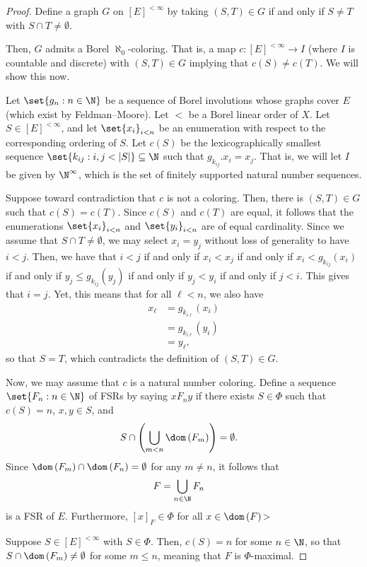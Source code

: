 \documentclass[10pt]{mypackage}
\begin{document}
\begin{proof}
  Define a graph $G$ on $\left[ E \right]^{ <\infty }$ by taking $\left( S,T \right)\in G$ if and only if $S\neq T$ with $S\cap T\neq \emptyset$.

  Then, $G$ admits a Borel $\aleph_0$-coloring. That is, a map $c\colon \left[ E \right]^{ <\infty }\to I$ (where $I$ is countable and discrete) with $\left( S,T \right)\in G$ implying that $c(S)\neq c(T)$. We will show this now.

  Let $\set{g_n : n\in \N}$ be a sequence of Borel involutions whose graphs cover $E$ (which exist by Feldman--Moore). Let $ < $ be a Borel linear order of $X$. Let $S\in \left[ E \right]^{ <\infty }$, and let $\set{x_i}_{ i<n }$ be an enumeration with respect to the corresponding ordering of $S$. Let $c(S)$  be the lexicographically smallest sequence $\set{k_{ij} : i,j < \left\vert S \right\vert}\subseteq \N$ such that $g_{k_{ij}}.x_i = x_j$. That is, we will let $I$ be given by $\N^{ \infty }$, which is the set of finitely supported natural number sequences.

  Suppose toward contradiction that $c$ is not a coloring. Then, there is $\left( S,T \right)\in G$ such that $c(S) = c(T)$. Since $c(S)$ and $c(T)$ are equal, it follows that the enumerations $\set{x_i}_{i < n}$ and $\set{y_i}_{ i < n }$ are of equal cardinality. Since we assume that $S\cap T\neq \emptyset$, we may select $x_i = y_j$ without loss of generality to have $i < j$. Then, we have that $ i < j $ if and only if $x_i < x_j$ if and only if $x_i < g_{k_{ij}}\left( x_i \right)$ if and only if $y_j \leq g_{k_{ij}}\left( y_j \right)$ if and only if $y_j < y_i$ if and only if $j < i$. This gives that $i = j$. Yet, this means that for all $\ell < n$, we also have
  \begin{align*}
    x_{\ell} &= g_{k_{i\ell}} \left( x_i \right)\\
             &= g_{k_{i\ell}}\left( y_i \right)\\
             &= y_{\ell},
  \end{align*}
  so that $S = T$, which contradicts the definition of $\left( S,T \right)\in G$.

  Now, we may assume that $c$ is a natural number coloring. Define a sequence $\set{F_n : n\in \N}$ of FSRs by saying $xF_ny$ if there exists $S\in \Phi$ such that $c(S) = n$, $x,y\in S$, and
  \begin{align*}
    S\cap \left( \bigcup_{m < n}\dom\left( F_m \right) \right) &= \emptyset.
  \end{align*}
  Since $\dom\left( F_m \right)\cap \dom\left( F_n \right) = \emptyset$ for any $m\neq n$, it follows that
  \begin{align*}
    F &= \bigcup_{n\in \N}F_n
  \end{align*}
  is a FSR of $E$. Furthermore, $\left[ x \right]_F\in \Phi$ for all $x\in \dom\left( F \right)$>

  Suppose $S\in \left[ E \right]^{ < \infty }$ with $S\in \Phi$. Then, $c(S) = n$ for some $n\in \N$, so that $S\cap \dom\left( F_m \right)\neq \emptyset$ for some $m\leq n$, meaning that $F$ is $\Phi$-maximal.
\end{proof}
\nocite{topics_in_orbit_equivalence,classical_descriptive_set_theory}
\printbibliography
\end{document}
